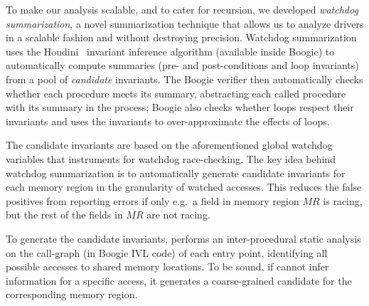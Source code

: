 
To make our analysis scalable, and to cater for recursion, we developed \emph{watchdog summarization}, a novel summarization technique that allows us to analyze drivers in a scalable fashion and without destroying precision.
Watchdog summarization uses the Houdini~\cite{flanagan2001houdini} invariant inference algorithm (available inside Boogie) to automatically compute summaries (pre- and post-conditions and loop invariants) from a pool of \emph{candidate} invariants.  The Boogie verifier then automatically checks whether each procedure meets its summary, abstracting each called procedure with its summary in the process; Boogie also checks whether loops respect their invariants and uses the invariants to over-approximate the effects of loops.

The candidate invariants are based on the aforementioned global watchdog variables that \whoop instruments for watchdog race-checking. The key idea behind watchdog summarization is to automatically generate candidate invariants for each memory region in the granularity of watched accesses. This reduces the false positives from reporting errors if only e.g.\ a field in memory region $\mathit{MR}$ is racing, but the rest of the fields in $\mathit{MR}$ are not racing.

To generate the candidate invariants, \whoop performs an inter-procedural static analysis on the call-graph (in Boogie IVL code) of each entry point, identifying all possible accesses to shared memory locations. To be sound, if \whoop cannot infer information for a specific access, it generates a coarse-grained candidate for the corresponding memory region.


